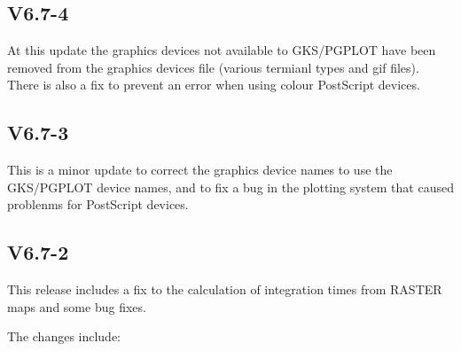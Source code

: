 \documentclass[twoside,11pt]{article}
\renewcommand{\_}{\texttt{\symbol{95}}}
\begin{document}
\subsection{V6.7-4}

At this update the graphics devices not available to GKS/PGPLOT have been
removed from the graphics devices file (various termianl types and gif files).
There is also a fix to prevent an error when using colour PostScript devices.

\subsection{V6.7-3}

This is a minor update to correct the graphics device names to use the
GKS/PGPLOT device names, and to fix a bug in the plotting system that caused
problenms for PostScript devices.

\subsection{V6.7-2}

This release includes a fix to the calculation of integration times from
RASTER maps and some bug fixes.

The changes include:
\end{document}
